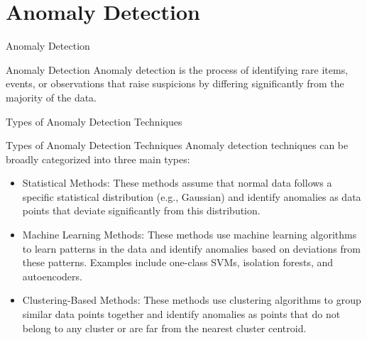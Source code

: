 \documentclass[hyperref={pdfpagelabels=false},aspectratio=169]{beamer}
\begin{document}
\section{Anomaly Detection}
\label{sec:orgbbd97b2}
\begin{frame}[label={sec:orgf55f911}]{Anomaly Detection}
\begin{block}{Anomaly Detection}
\pause
\alert{Anomaly detection} is the process of identifying rare items, events, or observations that raise suspicions by differing significantly from the majority of the data.
\end{block}
\end{frame}
\begin{frame}[label={sec:orgc3829ed}]{Types of Anomaly Detection Techniques}
\begin{block}{Types of Anomaly Detection Techniques}
\pause
Anomaly detection techniques can be broadly categorized into three main types:
\begin{itemize}[<+->]
\item \alert{Statistical Methods}: These methods assume that normal data follows a specific statistical distribution (e.g., Gaussian) and identify anomalies as data points that deviate significantly from this distribution.
\item \alert{Machine Learning Methods}: These methods use machine learning algorithms to learn patterns in the data and identify anomalies based on deviations from these patterns. Examples include one-class SVMs, isolation forests, and autoencoders.
\item \alert{Clustering-Based Methods}: These methods use clustering algorithms to group similar data points together and identify anomalies as points that do not belong to any cluster or are far from the nearest cluster centroid.
\end{itemize}
\end{block}
\end{frame}
\end{document}
